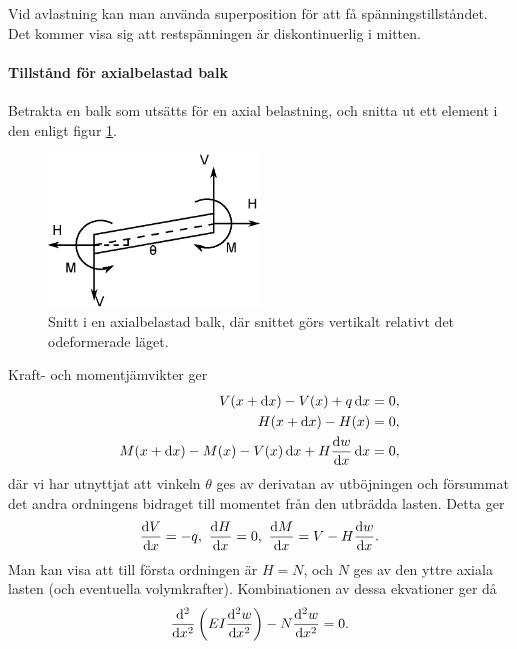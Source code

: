 Vid avlastning kan man använda superposition för att få spänningstillståndet. Det kommer visa sig att restspänningen är diskontinuerlig i mitten.

\paragraph{Tillstånd för axialbelastad balk}
Betrakta en balk som utsätts för en axial belastning, och snitta ut ett element i den enligt figur \ref{fig:skew_beam_forces}.
\begin{figure}
	\centering
	\includegraphics[width = 0.5\textwidth]{./Images/skew_beam_forces.eps}
	\caption{Snitt i en axialbelastad balk, där snittet görs vertikalt relativt det odeformerade läget.}
	\label{fig:skew_beam_forces}
\end{figure}
Kraft- och momentjämvikter ger
\begin{align*}
	V(x + \dd{x}) - V(x) + q\dd{x} = 0, \\
	H(x + \dd{x}) - H(x) = 0, \\
	M(x + \dd{x}) - M(x) - V(x)\dd{x} + H\dv{w}{x}\dd{x} = 0,
\end{align*}
där vi har utnyttjat att vinkeln $\theta$ ges av derivatan av utböjningen och försummat det andra ordningens bidraget till momentet från den utbrädda lasten. Detta ger
\begin{align*}
	\dv{V}{x} = -q,\ \dv{H}{x} = 0,\ \dv{M}{x} = V - H\dv{w}{x}.
\end{align*}
Man kan visa att till första ordningen är $H = N$, och $N$ ges av den yttre axiala lasten (och eventuella volymkrafter). Kombinationen av dessa ekvationer ger då
\begin{align*}
	\dv[2]{x}\left(EI\dv[2]{w}{x}\right) - N\dv[2]{w}{x} = 0.
\end{align*}
